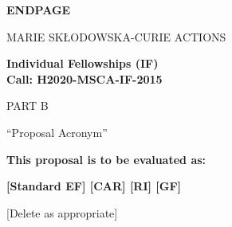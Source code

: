 \documentclass[a4paper,11pt]{article}
\newcommand{\acronym}{{\sc Proposal Acronym}\xspace\xspace}
\begin{document}
\newpage
\vspace{15mm}
\begin{center}


        \Large{
      
     
        \textbf{ENDPAGE}
  
          \vspace{15mm}
          MARIE SKŁODOWSKA-CURIE ACTIONS\\
          \vspace{1cm}
          
          \textbf{Individual Fellowships (IF)}\\
          \textbf{Call: H2020-MSCA-IF-2015}
          \vspace{2cm}                   

          PART B
          \vspace{2.5cm}

          ``\acronym''
          \vspace{2cm}

          \textbf{This proposal is to be evaluated as:}
          \vspace{.5cm}

          \textbf{[Standard EF] [CAR] [RI] [GF]}\\
        }
        \large{[Delete as appropriate]}

  \end{center}
\vspace{1cm}
\end{document}
